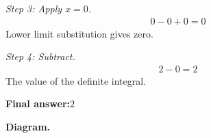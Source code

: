 \documentclass[11pt]{article}
\begin{document}
\textit{Step 3: Apply \( x = 0 \).}
\[\begin{gathered}
0 - 0 + 0 = 0
\end{gathered}\]
Lower limit substitution gives zero.

\textit{Step 4: Subtract.}
\[\begin{gathered}
2 - 0 = 2
\end{gathered}\]
The value of the definite integral.

\begin{answerbox}
\textbf{Final answer:}\quad \(\displaystyle 2\)
\end{answerbox}
\textbf{Diagram.}

\begin{center}
\end{center}
\end{document}
